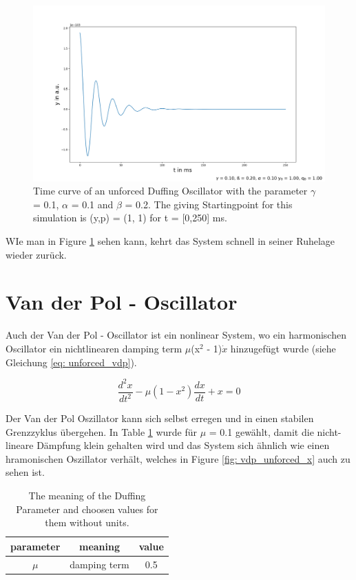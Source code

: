 \documentclass[oneside,10pt,a4paper]{report}
\begin{document}
		
		\begin{figure}[H]
			\centering
			\includegraphics[scale=0.4]{duffing_unforced_y.png}
			\caption{Time curve of an unforced Duffing Oscillator with the parameter $\gamma$ = 0.1, $\alpha$ = 0.1 and $\beta$ = 0.2. The giving Startingpoint for this simulation is (y,p) = (1, 1) for t = [0,250] ms.}
			\label{fig: duffing_unforced_y}
		\end{figure}
		
		WIe man in Figure \ref{fig: duffing_unforced_y} sehen kann, kehrt das System schnell in seiner Ruhelage wieder zurück.
		
		\cite{Nonlinear_Dynamic_and_chaos_book}
	
		\section{Van der Pol - Oscillator}
		Auch der Van der Pol - Oscillator ist ein nonlinear System, wo ein harmonischen Oscillator ein nichtlinearen damping term $\mu$(x$^2$ - 1)$\dot{x}$ hinzugefügt wurde (siehe Gleichung \ref{eq: unforced_vdp}).
		
		\begin{equation}\label{eq: unforced_vdp}
			\frac{d^2x}{dt^2} - \mu (1 - x^2) \frac{dx}{dt} + x = 0
		\end{equation}
		
		Der Van der Pol Oszillator kann sich selbst erregen und in einen stabilen Grenzzyklus übergehen. 
		In Table \ref{tab: vdp_ungetriebene_parameter} wurde für $\mu$ = 0.1 gewählt, damit die nicht-lineare Dämpfung klein gehalten wird und das System sich ähnlich wie einen hramonischen Oszillator verhält, welches in Figure \ref*{fig: vdp_unforced_x} auch zu sehen ist.
			\begin{table}[H]
			\centering
			\caption{The meaning of the Duffing Parameter and choosen values for them without units.}
			\label{tab: vdp_ungetriebene_parameter}
			\begin{tabular}{c c c}
				\toprule
				parameter & meaning & value\\
				\midrule
				$\mu$ & damping term & 0.5\\
				\bottomrule
			\end{tabular}
		\end{table}
		
\end{document}
